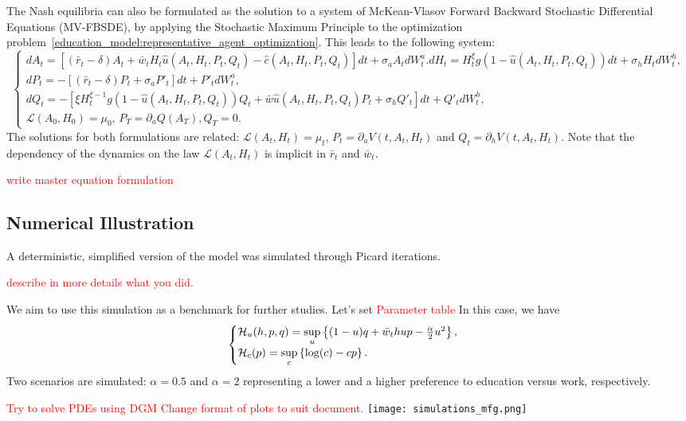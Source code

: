 The Nash equilibria can also be formulated as the solution to a system of 
McKean-Vlasov Forward Backward Stochastic Differential Equations (MV-FBSDE),
by applying the Stochastic Maximum Principle to the optimization problem~\eqref{education_model:representative_agent_optimization}.
This leads to the following system:
\begin{equation}\label{education_model:mfg_fbsde_system}
    \begin{cases}
        d A_t = \left[ (\bar r_t - \delta) A_t + \bar w_t H_t {\hat u}(A_t,H_t,P_t,Q_t) - {\hat c}(A_t,H_t,P_t,Q_t)  \right] dt + \sigma_a A_t d W^a_t.
        d H_t = H^\xi_t g(1 - {\hat u}(A_t,H_t,P_t,Q_t)) dt + \sigma_h H_t d W^h_t,\\
        d P_t = -\left[ (\bar r_t - \delta) P_t + \sigma_a P'_t \right]dt + P'_t d W^a_t,\\
        d Q_t = - \left[ \xi H_t^{\xi - 1} g(1 - {\hat u}(A_t,H_t,P_t,Q_t) ) Q_t + {\bar w} {\hat u}(A_t, H_t, P_t, Q_t) P_t + \sigma_h Q'_t \right] dt + Q'_t d W^h_t,\\
        \mathcal{L}(A_0, H_0) = \mu_0, \, P_T = \partial_a Q(A_T), Q_T = 0.
    \end{cases}
\end{equation}
The solutions for both formulations are related: $\mathcal{L}(A_t, H_t) = \mu_t$, $P_t = \partial_a V(t,A_t,H_t)$ and $Q_t = \partial_h V(t,A_t,H_t)$.
Note that the dependency of the dynamics on the law $\mathcal{L}(A_t,H_t)$ is implicit in $\bar r_t$ and $\bar w_t$.

\textcolor{red}{write master equation formulation}

\subsection{Numerical Illustration}
        A deterministic, simplified version of the model was simulated through Picard iterations.
        
        \textcolor{red}{describe in more details what you did.}
        
        We aim to use this simulation as a benchmark for further studies.        
        Let's set \textcolor{red}{Parameter table}
        In this case, we have 
        \begin{equation}
            \begin{cases}    
            \mathcal{H}_u(h,p,q) = \sup\limits_{u} \left\{ (1 - u)q + \bar w_t h u p - \frac{\alpha}{2} u^2 \right\},\\
            \mathcal{H}_c (p) = \sup\limits_{c} \left\{ \log(c) - cp \right\}.
            \end{cases}
        \end{equation} 
        Two scenarios are simulated: $\alpha = 0.5$ and  $\alpha = 2$ representing a lower and a higher preference to education versus work, respectively.

        \textcolor{red}{Try to solve PDEs using DGM}
        \textcolor{red}{Change format of plots to suit document.}
        \texttt{[image: simulations\_mfg.png]}